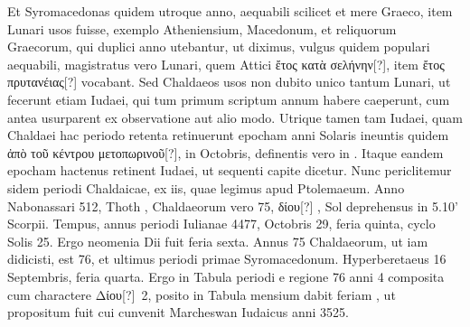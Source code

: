 Et Syromacedonas quidem utroque anno, aequabili
scilicet et mere Graeco, item Lunari usos fuisse, exemplo Atheniensium,
Macedonum, et reliquorum Graecorum, qui duplici anno
utebantur, ut diximus, vulgus quidem populari aequabili, magistratus
vero Lunari, quem Attici \textgreek{ἔτος κατὰ σελήνην[?]},
 item \textgreek{ἔτος πρυτανέιας[?]}
vocabant.
Sed Chaldaeos usos non dubito unico tantum Lunari,
ut fecerunt etiam Iudaei, qui tum primum scriptum annum
habere caeperunt, cum antea usurparent ex observatione aut alio
modo.
Utrique tamen tam Iudaei, quam Chaldaei hac periodo retenta
retinuerunt epocham anni Solaris ineuntis quidem \textgreek{ἀπὸ τοῦ κέντρου
μετοπωρινοῦ[?]}, in  Octobris, definentis vero in .
Itaque eandem
epocham hactenus retinent Iudaei, ut sequenti capite dicetur.
Nunc periclitemur sidem periodi Chaldaicae, ex iis, quae legimus
apud Ptolemaeum.
Anno Nabonassari 512, Thoth , Chaldaeorum
vero 75, \textgreek{δίου[?] },
 Sol deprehensus in 5.10' Scorpii.
Tempus, annus
periodi Iulianae 4477, Octobris 29, feria quinta, cyclo Solis 25.
Ergo neomenia Dii fuit feria sexta.
Annus 75 Chaldaeorum, ut iam
didicisti, est 76, et ultimus periodi primae Syromacedonum.
Hyperberetaeus 16 Septembris, feria quarta.
Ergo in Tabula periodi e regione
76 anni 4 composita cum charactere \textgreek{Δίου[?]}~2, posito in Tabula
mensium dabit feriam , ut propositum fuit cui cunvenit Marcheswan
Iudaicus anni 3525.

